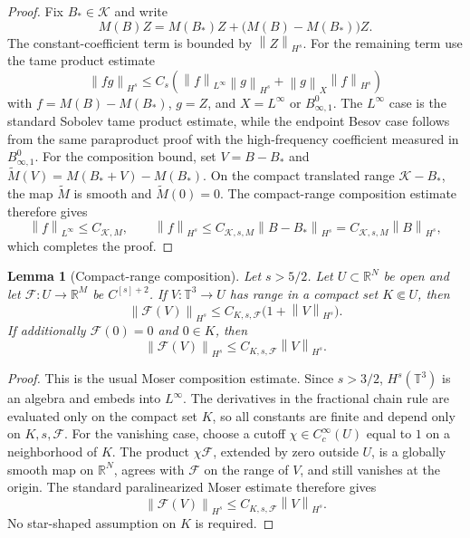 \documentclass[10pt,a4paper]{amsart}
\numberwithin{equation}{section}
\newtheorem{lemma}[theorem]{Lemma}
\newcommand{\T}{\mathbb T}
\newcommand{\R}{\mathbb R}
\newcommand{\norm}[1]{\left\lVert #1\right\rVert}
\begin{document}
\begin{proof}
Fix \(B_*\in\mathcal K\) and write
\[
  M(B)Z=M(B_*)Z+\bigl(M(B)-M(B_*)\bigr)Z .
\]
The constant-coefficient term is bounded by \(\norm{Z}_{H^s}\).  For the
remaining term use the tame product estimate
\[
  \norm{fg}_{H^s}
  \le C_s\left(
  \norm{f}_{L^\infty}\norm{g}_{H^s}
  +\norm{g}_{X}\norm{f}_{H^s}
  \right)
\]
with \(f=M(B)-M(B_*)\), \(g=Z\), and
\(X=L^\infty\) or \(B^0_{\infty,1}\).  The \(L^\infty\) case is the standard
Sobolev tame product estimate, while the endpoint Besov case follows from the
same paraproduct proof with the high-frequency coefficient measured in
\(B^0_{\infty,1}\).
For the composition bound, set \(V=B-B_*\) and
\(\widetilde M(V)=M(B_*+V)-M(B_*)\).  On the compact translated range
\(\mathcal K-B_*\), the map \(\widetilde M\) is smooth and
\(\widetilde M(0)=0\).  The compact-range composition estimate therefore gives
\[
  \norm{f}_{L^\infty}\le C_{\mathcal K,M},
  \qquad
  \norm{f}_{H^s}\le C_{\mathcal K,s,M}\norm{B-B_*}_{H^s}
  = C_{\mathcal K,s,M}\norm{B}_{H^s},
\]
which completes the proof.
\end{proof}

\begin{lemma}[Compact-range composition]
\label{lem:appendix-composition}
Let \(s>5/2\).  Let \(U\subset\R^N\) be open and let
\(\mathcal F:U\to\R^M\) be \(C^{[s]+2}\).  If \(V:\T^3\to U\) has range in a
compact set \(K\Subset U\), then
\[
  \norm{\mathcal F(V)}_{H^s}
  \le
  C_{K,s,\mathcal F}\bigl(1+\norm{V}_{H^s}\bigr).
\]
If additionally \(\mathcal F(0)=0\) and \(0\in K\), then
\[
  \norm{\mathcal F(V)}_{H^s}
  \le
  C_{K,s,\mathcal F}\norm{V}_{H^s}.
\]
\end{lemma}

\begin{proof}
This is the usual Moser composition estimate.  Since \(s>3/2\), \(H^s(\T^3)\)
is an algebra and embeds into \(L^\infty\).  The derivatives in the fractional
chain rule are evaluated only on the compact set \(K\), so all constants are
finite and depend only on \(K,s,\mathcal F\).  For the vanishing case, choose
a cutoff \(\chi\in C_c^\infty(U)\) equal to \(1\) on a neighborhood of \(K\).
The product \(\chi\mathcal F\), extended by zero outside \(U\), is a globally
smooth map on \(\R^N\), agrees with \(\mathcal F\) on the range of \(V\), and
still vanishes at the origin.  The standard paralinearized Moser estimate
therefore gives
\[
  \norm{\mathcal F(V)}_{H^s}
  \le
  C_{K,s,\mathcal F}\norm{V}_{H^s}.
\]
No star-shaped assumption on \(K\) is required.
\end{proof}
\end{document}
